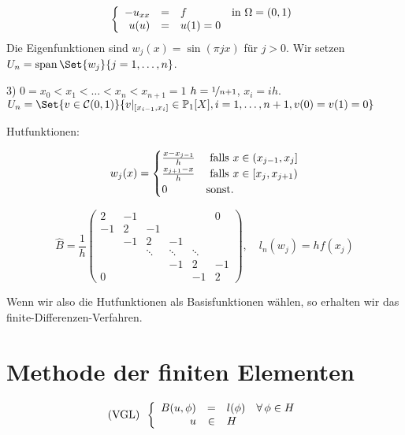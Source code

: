 \documentclass{cheat-sheet}
\newcommand{\Cont}{\mathcal{C}} %
\DeclareMathOperator{\spann}{span} %
\begin{document}
\begin{bsp}
  \[
    \left\{ \begin{array}{r c l l}
      - u_{xx} & = & f & \text{in } \Omega = \left( 0, 1 \right) \\
      u(u) & = & u(1) = 0
    \end{array} \right.
  \]
  Die Eigenfunktionen sind $w_j(x) = \sin(\pi j x)$ für $j > 0$.
  Wir setzen $U_n = \spann \Set{w_j}{j = 1, \ldots, n}$.
\end{bsp}



3) $0 = x_0 < x_1 < \ldots < x_n < x_{n+1} = 1$
$h = \nicefrac{1}{n+1}$, $x_i = i h$.
$U_n = \Set{v \in \Cont(0, 1)}{v|_{\cinterval{x_{i-1}}{x_i}} \in \mathbb{P}_1[X], i = 1, \ldots, n+1, v(0) = v(1) = 0}$

Hutfunktionen:

\[
  w_j (x) = \begin{cases}
    \tfrac{x - x_{j-1}}{h} & \text{ falls } x \in \left( x_{j-1}, x_j \right] \\
    \tfrac{x_{j+1} - x}{h} & \text{ falls } x \in \left[ x_j, x_{j+1} \right) \\
    0 & \text{sonst.}
  \end{cases}
\]

\[
  \hat{B} = \frac{1}{h} \begin{pmatrix}
    2 & -1 & &&& 0 \\
    -1 & 2 & -1 &&& \\
    & -1 & 2 & -1 && \\
    && \ddots & \ddots & \ddots \\
    &&& -1 & 2 & -1 \\
    0 &&&& -1 & 2
  \end{pmatrix}, \quad
  l_n(w_j) = h f(x_j)
\]

Wenn wir also die Hutfunktionen als Basisfunktionen wählen, so erhalten wir das finite-Differenzen-Verfahren.

\section{Methode der finiten Elementen}

\[
  \text{(VGL)} \enspace
  \left\{
  \begin{array}{r c l l}
    B(u, \phi) &=& l(\phi) & \forall \, \phi \in H \\
    u &\in& H
  \end{array}
  \right.
\]
\end{document}
